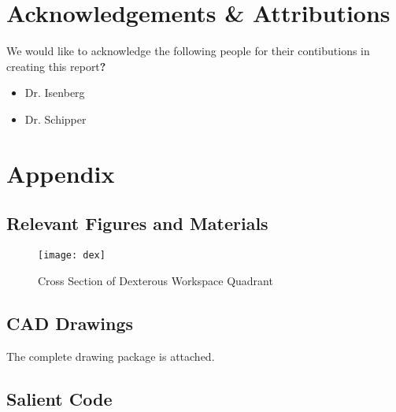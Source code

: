 

% 
% 

\newpage
\section*{Acknowledgements \& Attributions}
We would like to acknowledge the following people for their contibutions in creating this report\textbf{?}
\begin{itemize}
  \item Dr. Isenberg
  \item Dr. Schipper
\end{itemize}
\newpage



\newpage
\appendix
\renewcommand\thesection{\Roman{section}}
\renewcommand\thesubsection{\roman{subsection}}
\section{Appendix}\label{sec:app}
\subsection{Relevant Figures and Materials}
\begin{figure}[htp]
  \centering
  \texttt{[image: dex]}
  \caption{Cross Section of Dexterous Workspace Quadrant}
  \label{fig:dex}
\end{figure}
\subsection{CAD Drawings}
The complete drawing package is attached.

\subsection{Salient Code}

\vspace{10ex}


\vspace{10ex}


\vspace{10ex}

% 


